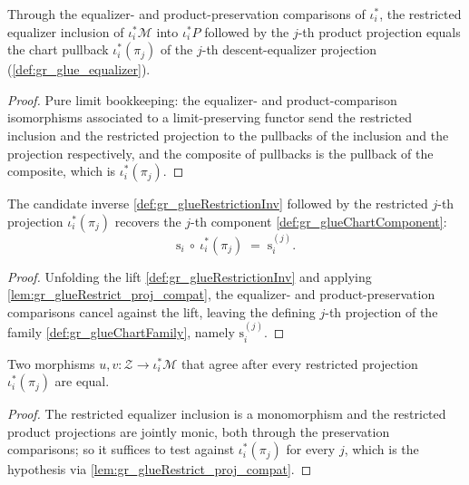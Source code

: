 \begin{lemma}
  \label{lem:gr_glueRestrict_proj_compat}
  Through the equalizer- and product-preservation comparisons of \(\iota_i^{*}\), the
  restricted equalizer inclusion of \(\iota_i^{*}\mathcal{M}\) into \(\iota_i^{*}P\)
  followed by the \(j\)-th product projection equals the chart pullback
  \(\iota_i^{*}(\pi_j)\) of the \(j\)-th descent-equalizer projection
  (\cref{def:gr_glue_equalizer}).
\end{lemma}
\begin{proof}
  \leanok
  Pure limit bookkeeping: the equalizer- and product-comparison isomorphisms
  associated to a limit-preserving functor send the restricted inclusion and the
  restricted projection to the pullbacks of the inclusion and the projection
  respectively, and the composite of pullbacks is the pullback of the composite, which
  is \(\iota_i^{*}(\pi_j)\).
\end{proof}

\begin{lemma}
  \label{lem:gr_glueRestrictionInv_proj}
  The candidate inverse \cref{def:gr_glueRestrictionInv} followed by the restricted
  \(j\)-th projection \(\iota_i^{*}(\pi_j)\) recovers the \(j\)-th component
  \cref{def:gr_glueChartComponent}:
  \[
    \mathrm{s}_i\ \circ\ \iota_i^{*}(\pi_j)
      \;=\; \mathrm{s}_i^{(j)} .
  \]
\end{lemma}
\begin{proof}
  \leanok
  Unfolding the lift \cref{def:gr_glueRestrictionInv} and applying
  \cref{lem:gr_glueRestrict_proj_compat}, the equalizer- and product-preservation
  comparisons cancel against the lift, leaving the defining \(j\)-th projection of the
  family \cref{def:gr_glueChartFamily}, namely \(\mathrm{s}_i^{(j)}\).
\end{proof}

\begin{lemma}
  \label{lem:gr_glueRestrict_hom_ext}
  Two morphisms \(u, v : \mathcal{Z} \to \iota_i^{*}\mathcal{M}\) that agree after every
  restricted projection \(\iota_i^{*}(\pi_j)\) are equal.
\end{lemma}
\begin{proof}
  \leanok
  The restricted equalizer inclusion is a monomorphism and the restricted product
  projections are jointly monic, both through the preservation comparisons; so it
  suffices to test against \(\iota_i^{*}(\pi_j)\) for every \(j\), which is the
  hypothesis via \cref{lem:gr_glueRestrict_proj_compat}.
\end{proof}

